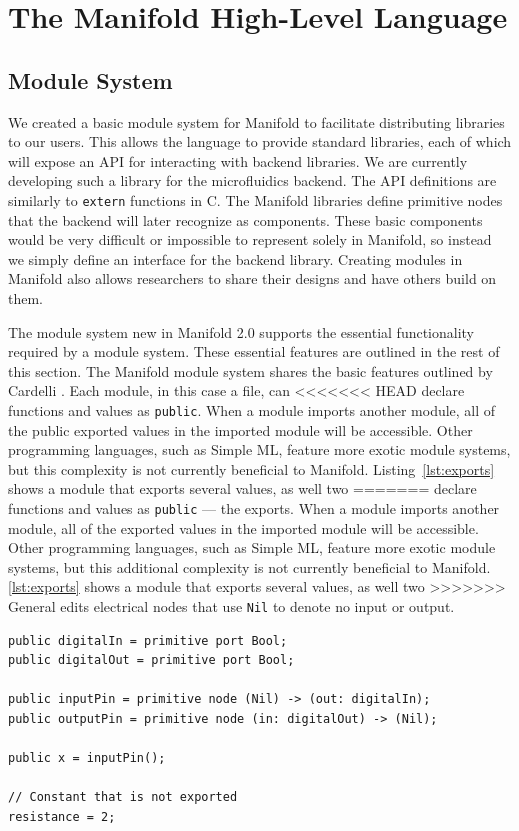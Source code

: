 \section{The Manifold High-Level Language}

\subsection{Module System}

We created a basic module system for Manifold to facilitate
distributing libraries to our users. This allows the language to provide standard
libraries, each of which will expose an API for interacting with backend
libraries. We are currently developing such a library for the microfluidics backend. The API definitions
are similarly to \texttt{extern} functions in C. The Manifold libraries
define primitive
nodes that the backend will later recognize as components. These basic
components would be very difficult or impossible to represent solely in Manifold,
so instead we simply define an interface for the backend library. Creating
modules in Manifold also allows researchers to share their designs and have
others build on them.

The module system new in Manifold 2.0 supports the essential functionality required by a module system. These
essential features are outlined in the rest of this section.
The Manifold module system shares the basic features outlined by Cardelli
\cite{Cardelli:1997:PFL:263699.263735}. Each module, in this case a file, can
<<<<<<< HEAD
declare functions and values as \texttt{public}. When a module imports another
module, all of the public exported values in the imported module will be
accessible. Other programming languages, such as Simple ML, feature more exotic module systems, but this complexity
is not currently beneficial to Manifold. Listing~\ref{lst:exports} shows a module that exports several values, as well two
=======
declare functions and values as \texttt{public} --- the exports. When a module imports another
module, all of the exported values in the imported module will be
accessible. Other programming languages, such as Simple ML, feature more exotic module systems, but this
additional complexity is not currently beneficial to Manifold. \autoref{lst:exports} shows a module
that exports several values, as well two
>>>>>>> General edits
electrical nodes that use \texttt{Nil} to denote no input or output.

\begin{lstlisting}[label=lst:exports, caption=Exported values in a Manifold file]
public digitalIn = primitive port Bool;
public digitalOut = primitive port Bool;

public inputPin = primitive node (Nil) -> (out: digitalIn);
public outputPin = primitive node (in: digitalOut) -> (Nil);

public x = inputPin();

// Constant that is not exported
resistance = 2;
\end{lstlisting}

